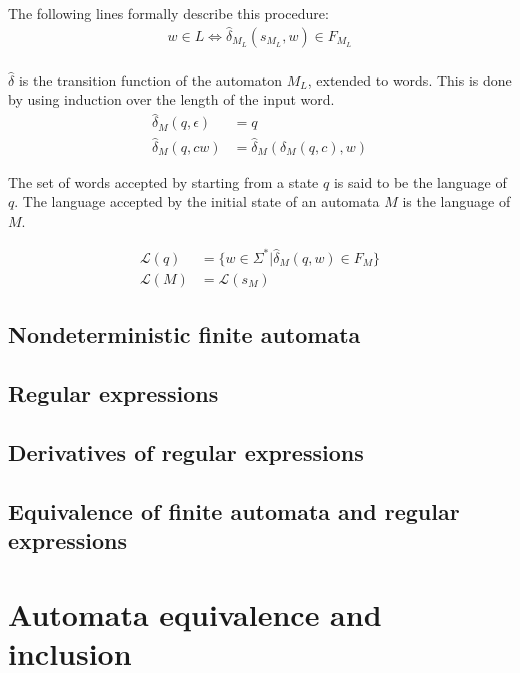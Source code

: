 The following lines formally describe this procedure:
\begin{align}
    w \in L \Leftrightarrow \hat\delta_{M_L}(s_{M_L}, w) \in F_{M_L} \\
\end{align}

\begin{definition}
    $\hat\delta$ is the transition function of the automaton $M_L$, extended to words.
    This is done by using induction over the length of the input word.
    \begin{align}
        \hat\delta_M(q, \epsilon) &= q\\
        \hat\delta_M(q, c w) &= \hat\delta_M(\delta_M(q, c), w)
    \end{align}
\end{definition}

\begin{definition}
    The set of words accepted by starting from a state $q$ is said to be the language of $q$.
    The language accepted by the initial state of an automata $M$ is the language of $M$.

    \begin{align}
        \mathcal{L}(q) &= \{ w \in \Sigma^\ast | \hat\delta_M(q, w) \in F_M \}\\
        \mathcal{L}(M) &= \mathcal{L}(s_M)
    \end{align}
\end{definition}

\subsection{Nondeterministic finite automata}

\subsection{Regular expressions}

\subsection{Derivatives of regular expressions}

\subsection{Equivalence of finite automata and regular expressions}

\section{Automata equivalence and inclusion}


